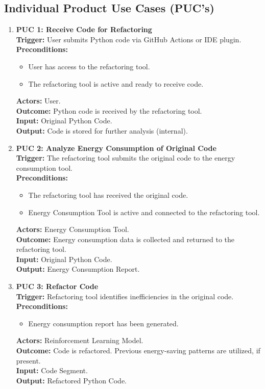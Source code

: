 \documentclass[12pt]{article}
\begin{document}
\subsection{Individual Product Use Cases (PUC's)}
\setlength{\parindent}{0pt}
\begin{enumerate}
\item \textbf{PUC 1: Receive Code for Refactoring} \\
\textbf{Trigger:} User submits Python code via GitHub Actions or IDE plugin. \\
\textbf{Preconditions:}
\begin{itemize}
    \item User has access to the refactoring tool.
    \item The refactoring tool is active and ready to receive code.
\end{itemize}
\textbf{Actors:} User. \\
\textbf{Outcome:} Python code is received by the refactoring tool. \\
\textbf{Input:} Original Python Code. \\
\textbf{Output:} Code is stored for further analysis (internal).

\item \textbf{PUC 2: Analyze Energy Consumption of Original Code} \\
\textbf{Trigger:} The refactoring tool submits the original code to the energy consumption tool. \\
\textbf{Preconditions:}
\begin{itemize}
    \item The refactoring tool has received the original code.
    \item Energy Consumption Tool is active and connected to the refactoring tool.
\end{itemize}
\textbf{Actors:} Energy Consumption Tool. \\
\textbf{Outcome:} Energy consumption data is collected and returned to the refactoring tool. \\
\textbf{Input:} Original Python Code. \\
\textbf{Output:} Energy Consumption Report.

\item \textbf{PUC 3: Refactor Code} \\
\textbf{Trigger:} Refactoring tool identifies inefficiencies in the original code. \\
\textbf{Preconditions:}
\begin{itemize}
    \item Energy consumption report has been generated.
\end{itemize}
\textbf{Actors:} Reinforcement Learning Model. \\
\textbf{Outcome:} Code is refactored. Previous energy-saving patterns are utilized, if present. \\
\textbf{Input:} Code Segment. \\
\textbf{Output:} Refactored Python Code.


\end{enumerate}
\end{document}

